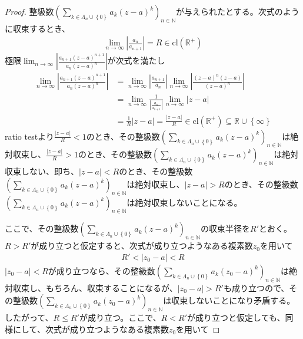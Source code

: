 \documentclass[dvipdfmx]{jsarticle}
\begin{document}
\begin{proof}
整級数$\left( \sum_{k \in \varLambda_{n} \cup \left\{ 0 \right\}} {a_{k}(z - a)^{k}} \right)_{n \in \mathbb{N}}$が与えられたとする。次式のように収束するとき、
\begin{align*}
\lim_{n \rightarrow \infty}\left| \frac{a_{n}}{a_{n + 1}} \right| = R \in \mathrm{cl}\left( \mathbb{R}^{+} \right)
\end{align*}
極限$\lim_{n \rightarrow \infty}\left| \frac{a_{n + 1}(z - a)^{n + 1}}{a_{n}(z - a)^{n}} \right|$が次式を満たし
\begin{align*}
\lim_{n \rightarrow \infty}\left| \frac{a_{n + 1}(z - a)^{n + 1}}{a_{n}(z - a)^{n}} \right| &= \lim_{n \rightarrow \infty}\left| \frac{a_{n + 1}}{a_{n}} \right|\lim_{n \rightarrow \infty}\left| \frac{(z - a)^{n}(z - a)}{(z - a)^{n}} \right|\\
&= \lim_{n \rightarrow \infty}\frac{1}{\left| \frac{a_{n}}{a_{n + 1}} \right|}\lim_{n \rightarrow \infty}|z - a|\\
&= \frac{1}{R}|z - a| = \frac{|z - a|}{R} \in \mathrm{cl}\left( \mathbb{R}^{+} \right) \subseteq \mathbb{R} \cup \left\{ \infty \right\}
\end{align*}
ratio testより$\frac{|z - a|}{R} < 1$のとき、その整級数$\left( \sum_{k \in \varLambda_{n} \cup \left\{ 0 \right\}} {a_{k}(z - a)^{k}} \right)_{n \in \mathbb{N}}$は絶対収束し、$\frac{|z - a|}{R} > 1$のとき、その整級数$\left( \sum_{k \in \varLambda_{n} \cup \left\{ 0 \right\}} {a_{k}(z - a)^{k}} \right)_{n \in \mathbb{N}}$は絶対収束しない、即ち、$|z - a| < R$のとき、その整級数$\left( \sum_{k \in \varLambda_{n} \cup \left\{ 0 \right\}} {a_{k}(z - a)^{k}} \right)_{n \in \mathbb{N}}$は絶対収束し、$|z - a| > R$のとき、その整級数$\left( \sum_{k \in \varLambda_{n} \cup \left\{ 0 \right\}} {a_{k}(z - a)^{k}} \right)_{n \in \mathbb{N}}$は絶対収束しないことになる。\par
ここで、その整級数$\left( \sum_{k \in \varLambda_{n} \cup \left\{ 0 \right\}} {a_{k}(z - a)^{k}} \right)_{n \in \mathbb{N}}$の収束半径を$R'$とおく。$R > R'$が成り立つと仮定すると、次式が成り立つようなある複素数$z_{0}$を用いて
\begin{align*}
R' < \left| z_{0} - a \right| < R
\end{align*}
$\left| z_{0} - a \right| < R$が成り立つなら、その整級数$\left( \sum_{k \in \varLambda_{n} \cup \left\{ 0 \right\}} {a_{k}\left( z_{0} - a \right)^{k}} \right)_{n \in \mathbb{N}}$は絶対収束し、もちろん、収束することになるが、$\left| z_{0} - a \right| > R'$も成り立つので、その整級数$\left( \sum_{k \in \varLambda_{n} \cup \left\{ 0 \right\}} {a_{k}\left( z_{0} - a \right)^{k}} \right)_{n \in \mathbb{N}}$は収束しないことになり矛盾する。したがって、$R \leq R'$が成り立つ。ここで、$R < R'$が成り立つと仮定しても、同様にして、次式が成り立つようなある複素数$z_{0}$を用いて

\end{proof}
\end{document}
